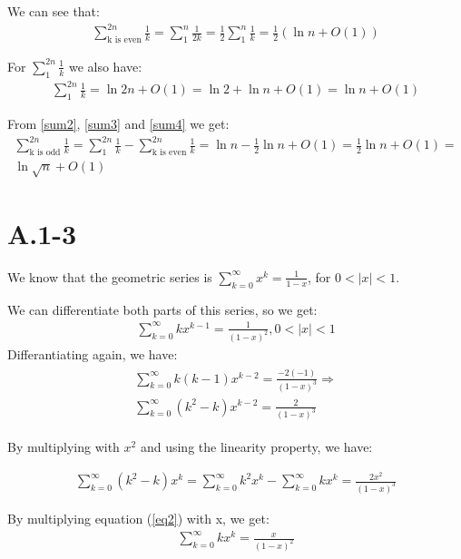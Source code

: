 \documentclass{article}
\begin{document}
We can see that:
\begin{gather}
    \sum_{\text{k is even}}^{2n}{\frac{1}{k}} = \sum_{1}^{n}{\frac{1}{2k}} = \frac{1}{2} \sum_{1}^{n}{\frac{1}{k}} = \frac{1}{2}(\ln{n} + O(1)) \label{sum3} 
\end{gather}

For $\sum_{1}^{2n}{\frac{1}{k}}$ we also have:
\begin{gather}
    \sum_{1}^{2n}{\frac{1}{k}} = \ln{2n} + O(1) = \ln{2} + \ln{n} + O(1) = \ln{n} + O(1) \label{sum4}
\end{gather}

From \ref{sum2}, \ref{sum3} and \ref{sum4} we get:
\begin{gather*}
    \sum_{\text{k is odd}}^{2n}{\frac{1}{k}} = \sum_{1}^{2n}{\frac{1}{k}} - \sum_{\text{k is even}}^{2n}{\frac{1}{k}} = \ln{n} - \frac{1}{2}\ln{n} + O(1) = \frac{1}{2}\ln{n} + O(1) =\\
    \ln{\sqrt{n}} + O(1)
\end{gather*}

\section*{A.1-3}
We know that the geometric series is $\sum_{k=0}^{\infty}{x^{k}} = \frac{1}{1 - x}$, for $0 < |x| < 1$.

We can differentiate both parts of this series, so we get:
\begin{gather}
    \sum_{k=0}^{\infty}{kx^{k-1}} = \frac{1}{(1 - x)^2},0< |x| < 1 \label{eq2}
\end{gather}
Differantiating again, we have:
\begin{gather*}
    \begin{align*}
        \sum_{k=0}^{\infty}{k(k-1)x^{k-2}} = \frac{-2(-1)}{(1 - x)^3} \Rightarrow \\
        \sum_{k=0}^{\infty}{(k^{2}-k)x^{k-2}} = \frac{2}{(1-x)^{3}}
    \end{align*}
\end{gather*}

By multiplying with $x^{2}$ and using the linearity property, we have:

\begin{gather}
    \sum_{k=0}^{\infty}{(k^{2}-k)x^{k}} = \sum_{k=0}^{\infty}{k^{2}x^{k}} - \sum_{k=0}^{\infty}{kx^{k}} = \frac{2x^{2}}{(1-x)^{3}} \label{eq3}
\end{gather}

By multiplying equation (\ref{eq2}) with x, we get:
\begin{gather}
    \sum_{k=0}^{\infty}{kx^{k}} = \frac{x}{(1 - x)^2} \label{eq4}
\end{gather}
\end{document}
